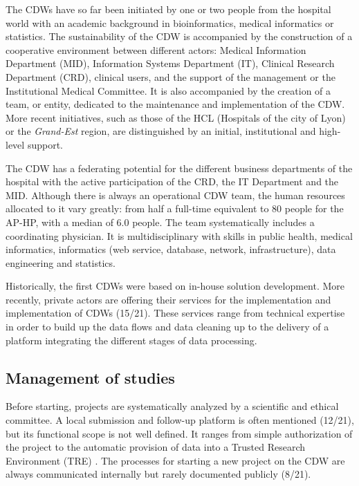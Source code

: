 \documentclass[french,12pt,twoside,a4paper]{book}
\begin{document}
The CDWs have so far been initiated by one or two people from the hospital world
with an academic background in bioinformatics, medical informatics or
statistics. The sustainability of the CDW is accompanied by the construction of
a cooperative environment between different actors: Medical Information
Department (MID), Information Systems Department (IT), Clinical Research
Department (CRD), clinical users, and the support of the management or the
Institutional Medical Committee. It is also accompanied by the creation of a
team, or entity, dedicated to the maintenance and implementation of the CDW.
More recent initiatives, such as those of the HCL (Hospitals of the city of
Lyon) or the \textit{Grand-Est} region, are distinguished by an initial,
institutional and high-level support.

The CDW has a federating potential for the different business departments of the
hospital with the active participation of the CRD, the IT Department and the
MID. Although there is always an operational CDW team, the human resources
allocated to it vary greatly: from half a full-time equivalent to 80 people for
the AP-HP, with a median of 6.0 people. The team systematically includes a
coordinating physician. It is multidisciplinary with skills in public health,
medical informatics, informatics (web service, database, network,
infrastructure), data engineering and statistics.

Historically, the first CDWs were based on in-house solution development. More
recently, private actors are offering their services for the implementation and
implementation of CDWs (15/21). These services range from technical
expertise in order to build up the data flows and data cleaning up to the delivery
of a platform integrating the different stages of data processing.

\subsection{Management of studies}

Before starting, projects are systematically analyzed by a scientific and
ethical committee. A local submission and follow-up platform is often mentioned
(12/21), but its functional scope is not well defined. It ranges from simple
authorization of the project to the automatic provision of data into a Trusted
Research Environment (TRE) \citep{goldacre_better_2022}. The processes for
starting a new project on the CDW are always communicated internally but rarely
documented publicly (8/21).
\end{document}
